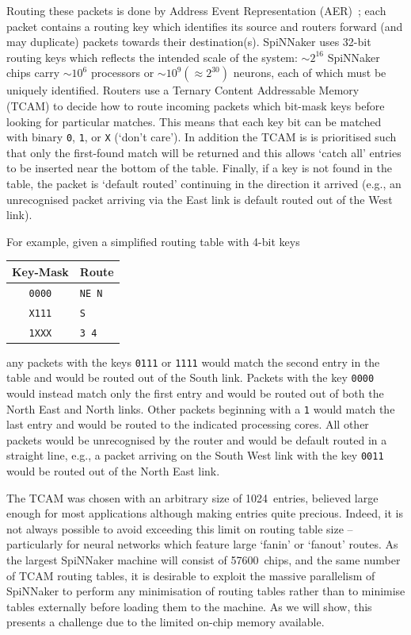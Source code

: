 \documentclass[conference]{IEEEtran}
\newcommand{\mytt}[1]{\texttt{\footnotesize#1}}
\begin{document}
Routing these packets is done by Address Event Representation (AER)~\parencite{Boahen2000}; each packet contains a routing key which identifies its source and routers forward (and may duplicate) packets towards their destination(s).
SpiNNaker uses 32-bit routing keys which reflects the intended scale of the system: $\sim2^{16}$ SpiNNaker chips carry $\sim10^6$ processors or $\sim10^9 (\approx 2^{30})$ neurons, each of which must be uniquely identified.
Routers use a Ternary Content Addressable Memory (TCAM) to decide how to route incoming packets which bit-mask keys before looking for particular matches.
This means that each key bit can be matched with binary \mytt{0}, \mytt{1}, or \mytt{X} (`don't care').
In addition the TCAM is is prioritised such that only the first-found match will be returned and this allows `catch all' entries to be inserted near the bottom of the table.
Finally, if a key is not found in the table, the packet is `default routed' continuing in the direction it arrived (e.g., an unrecognised packet arriving via the East link is default routed out of the West link).

For example, given a simplified routing table with 4-bit keys

\begin{table}[H]
  \centering
  \begin{tabular}{c l}
    \toprule
    Key-Mask & Route \\
    \midrule
    \texttt{0000} & \texttt{NE N}\\
    \texttt{X111} & \texttt{S}\\
    \texttt{1XXX} & \texttt{3 4}\\
    \bottomrule
  \end{tabular}
\end{table}

\noindent any packets with the keys \mytt{0111} or \mytt{1111} would match the second entry in the table and would be routed out of the South link.
Packets with the key \mytt{0000} would instead match only the first entry and would be routed out of both the North East and North links.
Other packets beginning with a \mytt{1} would match the last entry and would be routed to the indicated processing cores.
All other packets would be unrecognised by the router and would be default routed in a straight line, e.g., a packet arriving on the South West link with the key \mytt{0011} would be routed out of the North East link.

The TCAM was chosen with an arbitrary size of \num{1024}~entries, believed large enough for most applications although making entries quite precious.
Indeed, it is not always possible to avoid exceeding this limit on routing table size -- particularly for neural networks which feature large `fanin' or `fanout' routes.
As the largest SpiNNaker machine will consist of \num{57600}~chips, and the same number of TCAM routing tables, it is desirable to exploit the massive parallelism of SpiNNaker to perform any minimisation of routing tables rather than to minimise tables externally before loading them to the machine. As we will show, this presents a challenge due to the limited on-chip memory available.
\end{document}
